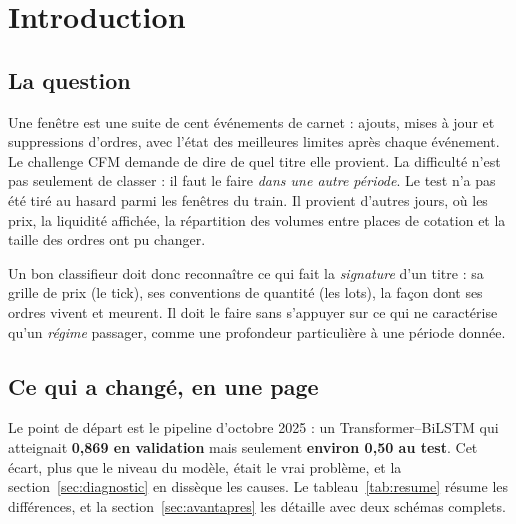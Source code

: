 \section{Introduction}

\subsection{La question}
Une fenêtre est une suite de cent événements de carnet : ajouts, mises à jour et suppressions d'ordres, avec l'état des meilleures limites après chaque événement. Le challenge CFM demande de dire de quel titre elle provient. La difficulté n'est pas seulement de classer : il faut le faire \emph{dans une autre période}. Le test n'a pas été tiré au hasard parmi les fenêtres du train. Il provient d'autres jours, où les prix, la liquidité affichée, la répartition des volumes entre places de cotation et la taille des ordres ont pu changer.

Un bon classifieur doit donc reconnaître ce qui fait la \emph{signature} d'un titre : sa grille de prix (le tick), ses conventions de quantité (les lots), la façon dont ses ordres vivent et meurent. Il doit le faire sans s'appuyer sur ce qui ne caractérise qu'un \emph{régime} passager, comme une profondeur particulière à une période donnée.

\subsection{Ce qui a changé, en une page}
Le point de départ est le pipeline d'octobre 2025 : un Transformer--BiLSTM qui atteignait \textbf{0,869 en validation} mais seulement \textbf{environ 0,50 au test}. Cet écart, plus que le niveau du modèle, était le vrai problème, et la section~\ref{sec:diagnostic} en dissèque les causes. Le tableau~\ref{tab:resume} résume les différences, et la section~\ref{sec:avantapres} les détaille avec deux schémas complets.

